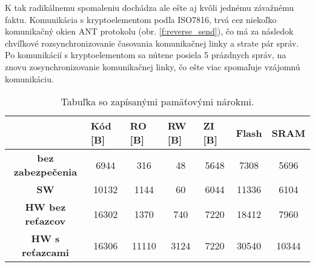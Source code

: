 \documentclass[12pt,a4wide,oneside,openright]{report}
\begin{document}
K tak radikálnemu spomaleniu dochádza ale ešte aj kvôli jednému závažnému faktu. Komunikácia s kryptoelementom podľa ISO7816, trvá cez niekoľko komunikačný okien ANT protokolu (obr. \ref{f:reverse_send}), čo má za následok chvíľkové rozsynchronizovanie časovania komunikačnej linky a strate pár správ. Po komunikácií s kryptoelementom sa nútene posiela 5 prázdnych správ, na znovu zosynchronizovanie komunikačnej linky, čo ešte viac spomaľuje vzájomnú komunikáciu.

\begin{table}[h]
	\centering
	\caption{Tabuľka so zapísanými pamäťovými nárokmi.}
	\label{t:t_memory}
\begin{tabular}{|c|c|c|c|c|c|c|}
	\hline
     & \multicolumn{1}{l|}{\textbf{Kód {[}B{]}}} & \multicolumn{1}{l|}{\textbf{RO {[}B{]}}} & \multicolumn{1}{l|}{\textbf{RW  {[}B{]}}} & \multicolumn{1}{l|}{\textbf{ZI  {[}B{]}}} & \multicolumn{1}{l|}{\textbf{Flash}} & \multicolumn{1}{l|}{\textbf{SRAM}} \\ \hline
	\textbf{bez zabezpečenia} & 6944 & 316 & 48 & 5648 & 7308 & 5696 \\ \hline
	\textbf{SW} & 10132 & 1144 & 60 & 6044 & 11336 & 6104 \\ \hline
	\textbf{HW bez reťazcov} & 16302 & 1370 & 740 & 7220 & 18412 & 7960 \\ \hline
	\textbf{HW s reťazcami} & 16306 & 11110 & 3124 & 7220 & 30540 & 10344 \\ \hline
\end{tabular}
\end{table}


\end{document}
